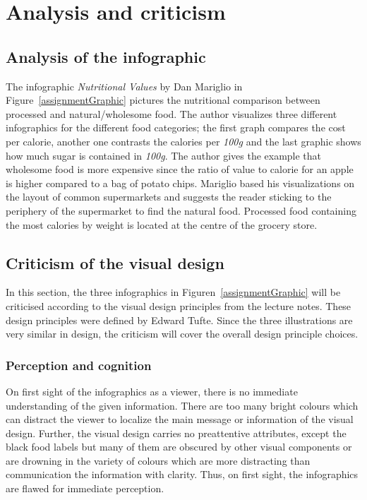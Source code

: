 \section{Analysis and criticism}

\subsection{Analysis of the infographic}

The infographic \textit{Nutritional Values} by Dan Mariglio in
Figure~\ref{assignmentGraphic} pictures the nutritional comparison between
processed and natural/wholesome food. The author visualizes three different
infographics for the different food categories; the first graph compares the
cost per calorie, another one contrasts the calories per \textit{100g} and the
last graphic shows how much sugar is contained in \textit{100g}. The author
gives the example that wholesome food is more expensive since the ratio of value
to calorie for an apple is higher compared to a bag of potato chips. Mariglio
based his visualizations on the layout of common supermarkets and suggests the
reader sticking to the periphery of the supermarket to find the natural food.
Processed food containing the most calories by weight is located at the centre
of the grocery store.

\subsection{Criticism of the visual design}

In this section, the three infographics in Figuren~\ref{assignmentGraphic} will
be criticised according to the visual design principles from the lecture notes.
These design principles were defined by Edward Tufte\cite{Tufte2001}. Since the
three illustrations are very similar in design, the criticism will cover the
overall design principle choices.

\subsubsection{Perception and cognition}

On first sight of the infographics as a viewer, there is no immediate
understanding of the given information. There are too many bright colours which
can distract the viewer to localize the main message or information of the
visual design. Further, the visual design carries no preattentive attributes,
except the black food labels but many of them are obscured by other visual
components or are drowning in the variety of colours which are more distracting
than communication the information with clarity.  Thus, on first sight, the
infographics are flawed for immediate perception.

